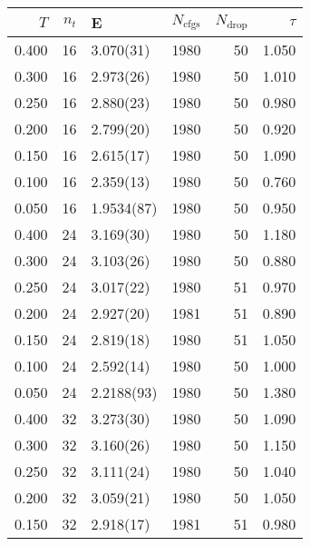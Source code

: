 \begin{tabular}{rrlrrr}
\hline
   $T$ &   $n_t$ & E          &   $N_\textrm{cfgs}$ &   $N_\textrm{drop}$ &   $\tau$ \\
\hline
 0.400 &      16 & 3.070(31)  &                1980 &                  50 &    1.050 \\
 0.300 &      16 & 2.973(26)  &                1980 &                  50 &    1.010 \\
 0.250 &      16 & 2.880(23)  &                1980 &                  50 &    0.980 \\
 0.200 &      16 & 2.799(20)  &                1980 &                  50 &    0.920 \\
 0.150 &      16 & 2.615(17)  &                1980 &                  50 &    1.090 \\
 0.100 &      16 & 2.359(13)  &                1980 &                  50 &    0.760 \\
 0.050 &      16 & 1.9534(87) &                1980 &                  50 &    0.950 \\
 0.400 &      24 & 3.169(30)  &                1980 &                  50 &    1.180 \\
 0.300 &      24 & 3.103(26)  &                1980 &                  50 &    0.880 \\
 0.250 &      24 & 3.017(22)  &                1980 &                  51 &    0.970 \\
 0.200 &      24 & 2.927(20)  &                1981 &                  51 &    0.890 \\
 0.150 &      24 & 2.819(18)  &                1980 &                  51 &    1.050 \\
 0.100 &      24 & 2.592(14)  &                1980 &                  50 &    1.000 \\
 0.050 &      24 & 2.2188(93) &                1980 &                  50 &    1.380 \\
 0.400 &      32 & 3.273(30)  &                1980 &                  50 &    1.090 \\
 0.300 &      32 & 3.160(26)  &                1980 &                  50 &    1.150 \\
 0.250 &      32 & 3.111(24)  &                1980 &                  50 &    1.040 \\
 0.200 &      32 & 3.059(21)  &                1980 &                  50 &    1.050 \\
 0.150 &      32 & 2.918(17)  &                1981 &                  51 &    0.980 \\

\end{tabular}
